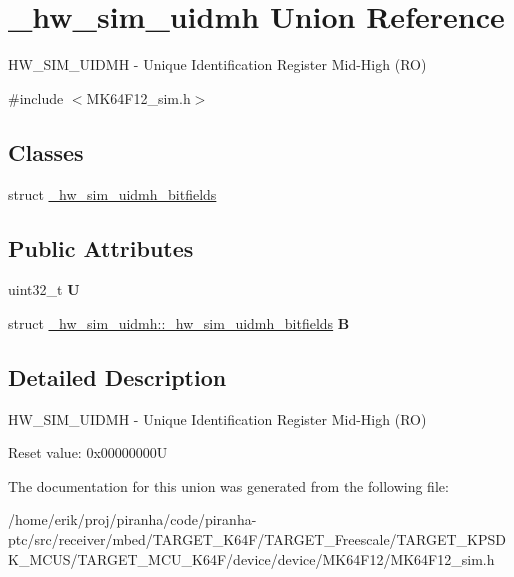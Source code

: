 \hypertarget{union__hw__sim__uidmh}{}\section{\+\_\+hw\+\_\+sim\+\_\+uidmh Union Reference}
\label{union__hw__sim__uidmh}


H\+W\+\_\+\+S\+I\+M\+\_\+\+U\+I\+D\+MH -\/ Unique Identification Register Mid-\/\+High (RO)  




{\ttfamily \#include $<$M\+K64\+F12\+\_\+sim.\+h$>$}

\subsection*{Classes}
\begin{DoxyCompactItemize}
\item 
struct \hyperlink{struct__hw__sim__uidmh_1_1__hw__sim__uidmh__bitfields}{\+\_\+hw\+\_\+sim\+\_\+uidmh\+\_\+bitfields}
\end{DoxyCompactItemize}
\subsection*{Public Attributes}
\begin{DoxyCompactItemize}
\item 
uint32\+\_\+t {\bfseries U}\hypertarget{union__hw__sim__uidmh_ad515308d85fc68e11332e8a74b26dbb6}{}\label{union__hw__sim__uidmh_ad515308d85fc68e11332e8a74b26dbb6}

\item 
struct \hyperlink{struct__hw__sim__uidmh_1_1__hw__sim__uidmh__bitfields}{\+\_\+hw\+\_\+sim\+\_\+uidmh\+::\+\_\+hw\+\_\+sim\+\_\+uidmh\+\_\+bitfields} {\bfseries B}\hypertarget{union__hw__sim__uidmh_a4c3baa721df3fdb64b70d4ad2f5a6276}{}\label{union__hw__sim__uidmh_a4c3baa721df3fdb64b70d4ad2f5a6276}

\end{DoxyCompactItemize}


\subsection{Detailed Description}
H\+W\+\_\+\+S\+I\+M\+\_\+\+U\+I\+D\+MH -\/ Unique Identification Register Mid-\/\+High (RO) 

Reset value\+: 0x00000000U 

The documentation for this union was generated from the following file\+:\begin{DoxyCompactItemize}
\item 
/home/erik/proj/piranha/code/piranha-\/ptc/src/receiver/mbed/\+T\+A\+R\+G\+E\+T\+\_\+\+K64\+F/\+T\+A\+R\+G\+E\+T\+\_\+\+Freescale/\+T\+A\+R\+G\+E\+T\+\_\+\+K\+P\+S\+D\+K\+\_\+\+M\+C\+U\+S/\+T\+A\+R\+G\+E\+T\+\_\+\+M\+C\+U\+\_\+\+K64\+F/device/device/\+M\+K64\+F12/M\+K64\+F12\+\_\+sim.\+h\end{DoxyCompactItemize}
